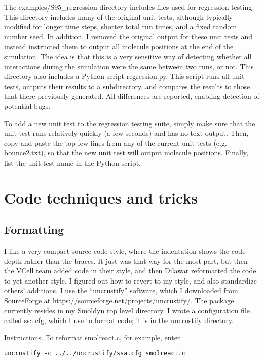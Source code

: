\documentclass {book}
\begin{document}
The examples/S95\_regression directory includes files used for regression testing. This directory includes many of the original unit tests, although typically modified for longer time steps, shorter total run times, and a fixed random number seed. In addition, I removed the original output for these unit tests and instead instructed them to output all molecule positions at the end of the simulation. The idea is that this is a very sensitive way of detecting whether all interactions during the simulation were the same between two runs, or not. This directory also includes a Python script regression.py. This script runs all unit tests, outputs their results to a subdirectory, and compares the results to those that there previously generated. All differences are reported, enabling detection of potential bugs.

To add a new unit test to the regression testing suite, simply make sure that the unit test runs relatively quickly (a few seconds) and has no text output. Then, copy and paste the top few lines from any of the current unit tests (e.g. bounce2.txt), so that the new unit test will output molecule positions. Finally, list the unit test name in the Python script.


\section{Code techniques and tricks}

\subsection{Formatting}

I like a very compact source code style, where the indentation shows the code depth rather than the braces. It just was that way for the most part, but then the VCell team added code in their style, and then Dilawar reformatted the code to yet another style. I figured out how to revert to my style, and also standardize others' additions. I use the ``uncrustify'' software, which I downloaded from SourceForge at \url{https://sourceforge.net/projects/uncrustify/}. The package currently resides in my Smoldyn top level directory. I wrote a configuration file called ssa.cfg, which I use to format code; it is in the uncrustify directory.

Instructions. To reformat smolreact.c, for example, enter

\texttt{uncrustify -c ../../uncrustify/ssa.cfg smolreact.c}
\end{document}
